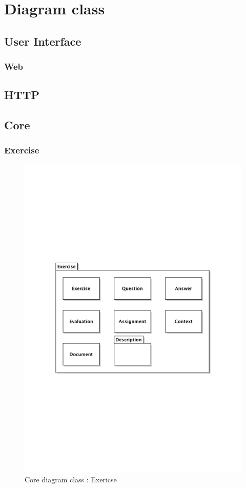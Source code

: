 \chapter{Diagram class}

\section{User Interface}
		\subsection{Web}
		
\section{HTTP}
\newpage
\section{Core}
	\subsection{Exercise}
		\begin{figure}[ht]
			\begin{center}
				\includegraphics[width=\textwidth,  trim=2cm 9cm 2cm 9cm]{UML_figure/DC/core/exercise/DC_Exercise.pdf}
				\caption{Core diagram class : Exericse}
			\end{center}
		\end{figure}
